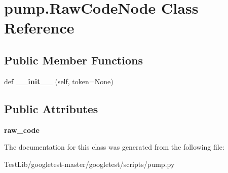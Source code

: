 \hypertarget{classpump_1_1RawCodeNode}{}\section{pump.\+Raw\+Code\+Node Class Reference}
\label{classpump_1_1RawCodeNode}
\subsection*{Public Member Functions}
\begin{DoxyCompactItemize}
\item 
\mbox{\label{classpump_1_1RawCodeNode_a7ba81f4da42d4e96a89713032867f87f}} 
def {\bfseries \+\_\+\+\_\+init\+\_\+\+\_\+} (self, token=None)
\end{DoxyCompactItemize}
\subsection*{Public Attributes}
\begin{DoxyCompactItemize}
\item 
\mbox{\label{classpump_1_1RawCodeNode_ab36224d959e0d8f803e9fac8e6a0baab}} 
{\bfseries raw\+\_\+code}
\end{DoxyCompactItemize}


The documentation for this class was generated from the following file\+:\begin{DoxyCompactItemize}
\item 
Test\+Lib/googletest-\/master/googletest/scripts/pump.\+py\end{DoxyCompactItemize}
